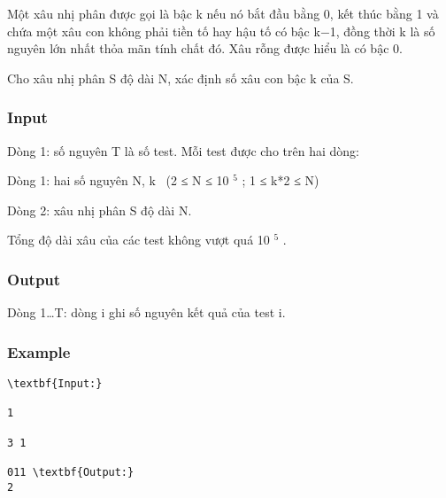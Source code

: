 



   Một xâu nhị phân được gọi là bậc k nếu nó bắt đầu bằng 0, kết thúc bằng 1 và chứa một xâu con không phải tiền tố hay hậu tố có bậc k−1, đồng thời k là số nguyên lớn nhất thỏa mãn tính chất đó. Xâu rỗng được hiểu là có bậc 0.  

   Cho xâu nhị phân S độ dài N, xác định số xâu con bậc k của S.  

\subsubsection{   Input  }

   Dòng 1: số nguyên T là số test. Mỗi test được cho trên hai dòng:  

   Dòng 1: hai số nguyên N, k  (2 ≤ N ≤ 10   $^    5   $   ; 1 ≤ k*2 ≤ N)  

   Dòng 2: xâu nhị phân S độ dài N.  

   Tổng độ dài xâu của các test không vượt quá 10   $^    5   $   .  

\subsubsection{   Output  }

   Dòng 1…T: dòng i ghi số nguyên kết quả của test i.  

\subsubsection{   Example  }
\begin{verbatim}
\textbf{Input:}

1

3 1

011 \textbf{Output:}
2\end{verbatim}
